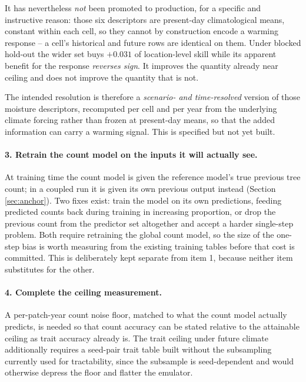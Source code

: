 \documentclass[11pt]{article}
\begin{document}
It has nevertheless \emph{not} been promoted to production, for a specific and instructive reason: those six descriptors are present-day climatological means, constant within each cell, so they cannot by construction encode a warming response -- a cell's historical and future rows are identical on them. Under blocked hold-out the wider set buys $+0.031$ of location-level skill while its apparent benefit for the response \emph{reverses sign}. It improves the quantity already near ceiling and does not improve the quantity that is not.

The intended resolution is therefore a \emph{scenario- and time-resolved} version of those moisture descriptors, recomputed per cell and per year from the underlying climate forcing rather than frozen at present-day means, so that the added information can carry a warming signal. This is specified but not yet built.

\paragraph{3. Retrain the count model on the inputs it will actually see.}
At training time the count model is given the reference model's true previous tree count; in a coupled run it is given its own previous output instead (Section \ref{sec:anchor}). Two fixes exist: train the model on its own predictions, feeding predicted counts back during training in increasing proportion, or drop the previous count from the predictor set altogether and accept a harder single-step problem. Both require retraining the global count model, so the size of the one-step bias is worth measuring from the existing training tables before that cost is committed. This is deliberately kept separate from item 1, because neither item substitutes for the other.

\paragraph{4. Complete the ceiling measurement.}
A per-patch-year count noise floor, matched to what the count model actually predicts, is needed so that count accuracy can be stated relative to the attainable ceiling as trait accuracy already is. The trait ceiling under future climate additionally requires a seed-pair trait table built without the subsampling currently used for tractability, since the subsample is seed-dependent and would otherwise depress the floor and flatter the emulator.
\end{document}
